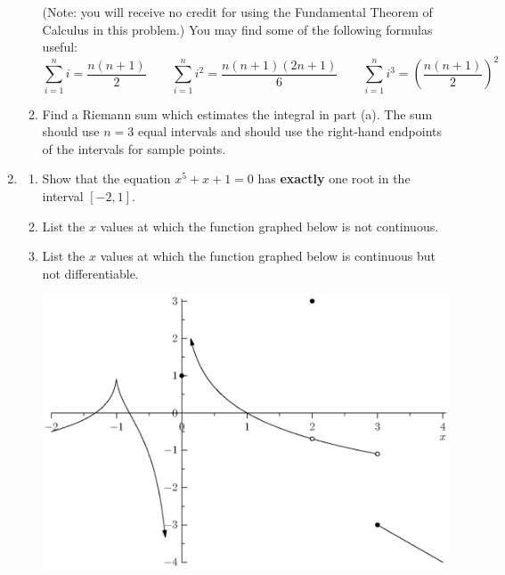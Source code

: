 \documentclass[12pt,legalpaper]{article}
\begin{document}
\begin{enumerate}
\begin{enumerate}
    (Note: you will receive no credit for 
    using the Fundamental Theorem of Calculus in this problem.)
    You may find some of the following formulas useful:
    \begin{displaymath}
      \sum_{i=1}^n i = \frac{n(n+1)}{2}
      \qquad
      \sum_{i=1}^n i^2 = \frac{n(n+1)(2n+1)}{6}
      \qquad
      \sum_{i=1}^n i^3 = \left(\frac{n(n+1)}{2}\right)^2
    \end{displaymath}
  \item Find a Riemann sum which estimates the integral in part (a).
    The sum should use $n=3$ equal intervals and should 
    use the right-hand endpoints of the intervals for sample points.
\vfill
  \end{enumerate}
\newpage
\item
  \begin{enumerate}
  \item Show
    that the equation $x^5+x+1 = 0$ has 
    \textbf{exactly} 
    one root in the interval $[-2,1]$.
\vfill
\vfill
\vfill
\vfill
  \item List the $x$ values at which the function graphed below 
    is not continuous.
\vfill
  \item List the $x$ values at which the function graphed below
    is continuous but not differentiable.
\vfill
    \begin{center}
      \includegraphics[width=6in]{cont.eps}
    \end{center}
  \end{enumerate}
\end{enumerate}
\end{document}
